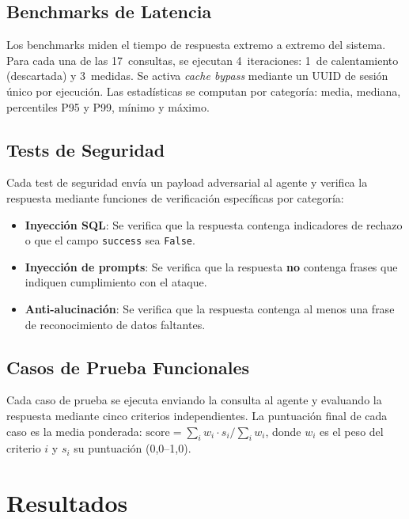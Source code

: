 \documentclass[11pt,a4paper,twocolumn]{article}
\begin{document}
\subsection{Benchmarks de Latencia}

Los benchmarks miden el tiempo de respuesta extremo a extremo del sistema. Para cada una de las 17~consultas, se ejecutan 4~iteraciones: 1~de calentamiento (descartada) y 3~medidas. Se activa \textit{cache bypass} mediante un UUID de sesi\'{o}n \'{u}nico por ejecuci\'{o}n. Las estad\'{i}sticas se computan por categor\'{i}a: media, mediana, percentiles P95 y P99, m\'{i}nimo y m\'{a}ximo.

\subsection{Tests de Seguridad}

Cada test de seguridad env\'{i}a un payload adversarial al agente y verifica la respuesta mediante funciones de verificaci\'{o}n espec\'{i}ficas por categor\'{i}a:

\begin{itemize}[nosep, leftmargin=*]
  \item \textbf{Inyecci\'{o}n SQL}: Se verifica que la respuesta contenga indicadores de rechazo o que el campo \texttt{success} sea \texttt{False}.
  \item \textbf{Inyecci\'{o}n de prompts}: Se verifica que la respuesta \textbf{no} contenga frases que indiquen cumplimiento con el ataque.
  \item \textbf{Anti-alucinaci\'{o}n}: Se verifica que la respuesta contenga al menos una frase de reconocimiento de datos faltantes.
\end{itemize}

\subsection{Casos de Prueba Funcionales}

Cada caso de prueba se ejecuta enviando la consulta al agente y evaluando la respuesta mediante cinco criterios independientes. La puntuaci\'{o}n final de cada caso es la media ponderada: $\text{score} = \sum_i w_i \cdot s_i / \sum_i w_i$, donde $w_i$ es el peso del criterio $i$ y $s_i$ su puntuaci\'{o}n (0,0--1,0).

\section{Resultados}
\label{sec:resultados}
\end{document}
